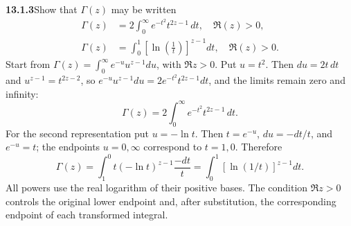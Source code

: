 \par\bigskip
\noindent\textbf{13.1.3}\quad Show that $\Gamma(z)$ may be written
\begin{align*}
\Gamma(z)&=2\int_{0}^{\infty}e^{-t^{2}}t^{2z-1}\,dt,\quad\Re(z)>0,\\
\Gamma(z)&=\int_{0}^{1}\left[\ln\left(\frac{1}{t}\right)\right]^{z-1}dt,
\quad\Re(z)>0.
\end{align*}
\solution
Start from $\Gamma(z)=\int_0^\infty e^{-u}u^{z-1}du$, with
$\Re z>0$.  Put $u=t^2$.  Then $du=2t\,dt$ and $u^{z-1}=t^{2z-2}$,
so $e^{-u}u^{z-1}du=2e^{-t^2}t^{2z-1}dt$, and the limits remain
zero and infinity:
\[
\boxed{\Gamma(z)=2\int_0^\infty e^{-t^2}t^{2z-1}\,dt}.
\]
For the second representation put $u=-\ln t$.
Then $t=e^{-u}$, $du=-dt/t$, and $e^{-u}=t$; the endpoints
$u=0,\infty$ correspond to $t=1,0$.  Therefore
\[
\Gamma(z)=\int_1^0 t(-\ln t)^{z-1}\frac{-dt}{t}
=\boxed{\int_0^1\left[\ln(1/t)\right]^{z-1}dt}.
\]
All powers use the real logarithm of their positive bases.  The
condition $\Re z>0$ controls the original lower endpoint and, after
substitution, the corresponding endpoint of each transformed integral.


